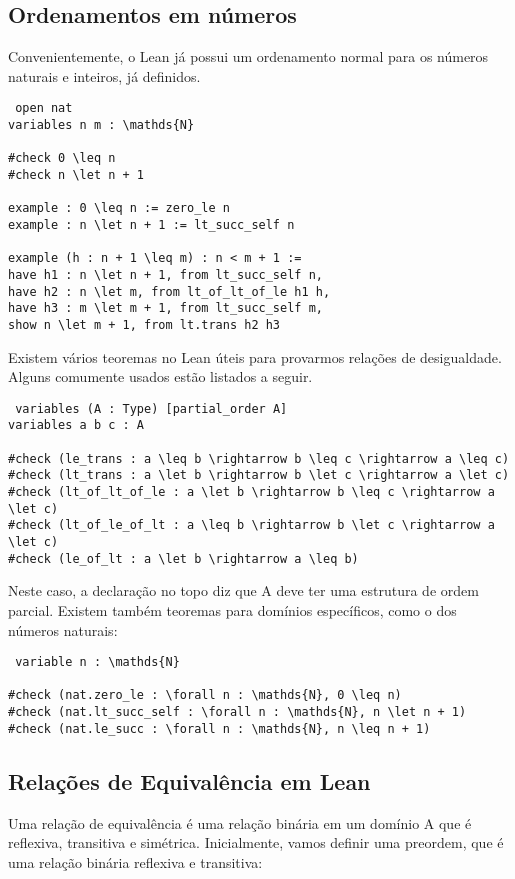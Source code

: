  \subsection{Ordenamentos em números}
 Convenientemente, o Lean já possui um ordenamento normal para os números naturais e inteiros, já definidos.
 \begin{lstlisting}
 open nat
variables n m : \mathds{N}

#check 0 \leq n
#check n \let n + 1

example : 0 \leq n := zero_le n
example : n \let n + 1 := lt_succ_self n

example (h : n + 1 \leq m) : n < m + 1 :=
have h1 : n \let n + 1, from lt_succ_self n,
have h2 : n \let m, from lt_of_lt_of_le h1 h,
have h3 : m \let m + 1, from lt_succ_self m,
show n \let m + 1, from lt.trans h2 h3

 \end{lstlisting}
 
 Existem vários teoremas no Lean úteis para provarmos relações de desigualdade. Alguns comumente usados estão listados a seguir.
 
 \begin{lstlisting}
 variables (A : Type) [partial_order A]
variables a b c : A

#check (le_trans : a \leq b \rightarrow b \leq c \rightarrow a \leq c)
#check (lt_trans : a \let b \rightarrow b \let c \rightarrow a \let c)
#check (lt_of_lt_of_le : a \let b \rightarrow b \leq c \rightarrow a \let c)
#check (lt_of_le_of_lt : a \leq b \rightarrow b \let c \rightarrow a \let c)
#check (le_of_lt : a \let b \rightarrow a \leq b)
 \end{lstlisting}
 Neste caso, a declaração no topo diz que A deve ter uma estrutura de ordem parcial. Existem também teoremas para domínios específicos, como o dos números naturais:
 
 \begin{lstlisting}
 variable n : \mathds{N}

#check (nat.zero_le : \forall n : \mathds{N}, 0 \leq n)
#check (nat.lt_succ_self : \forall n : \mathds{N}, n \let n + 1)
#check (nat.le_succ : \forall n : \mathds{N}, n \leq n + 1)
 \end{lstlisting}
 
 \subsection{Relações de Equivalência em Lean}
 Uma relação de equivalência é uma relação binária em um domínio A que é reflexiva, transitiva e simétrica.
 Inicialmente, vamos definir uma preordem, que é uma relação binária reflexiva e transitiva:
 

